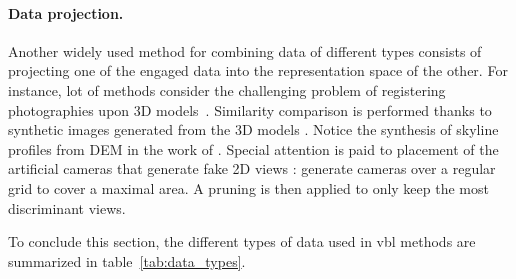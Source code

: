 		\paragraph{Data projection.}
			Another widely used method for combining data of different types consists of projecting one of the engaged data into the representation space of the other. For instance, lot of methods consider the challenging problem of registering photographies upon 3D models~\citep{Baatz2012,Kendall2015,Arth2015,Pascoe2015,Pascoe2015a,Pascoe2015b}. Similarity comparison is performed thanks to synthetic images generated from the 3D models \citep{Russell2011,Mason2011,Aubry2014,Poglitsch2015}. Notice the synthesis of skyline profiles from DEM in the work of \citet{Baatz2012}. Special attention is paid to placement of the artificial cameras that generate fake 2D views \citep{Irschara2009,Gee2012,Torii2015}: \citet{Aubry2014} generate cameras over a regular grid to cover a maximal area. A pruning is then applied to only keep the most discriminant views.

	
	
To conclude this section, the different types of data used in \ac{vbl} methods are summarized in table~\ref{tab:data_types}.

